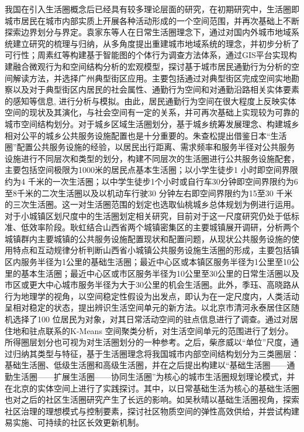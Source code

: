 \documentclass{shnuthesis}
\begin{document}
\indent 我国在引入生活圈概念后已经具有较多理论层面的研究，在初期研究中，生活圈即城市居民在城市内部实质上开展各种活动形成的一个空间范围，并再次基础上不断探索边界划分与界定。袁家东等人在日常生活圈理念下，通过对国内外城市地域系统建立研究的梳理与归纳，从多角度提出重建城市地域系统的理念，并初步分析了可行性\textsuperscript{\cite{yuan2005}}；周素红等构建基于智能图的个体行为调查方法体系，通过GIS平台实现构建融合微观行为和空间结构分析的宏观模型，探讨基于城市居民通勤行为分析的空间解读方法，并选择广州典型街区应用。主要包括通过对典型街区完成空间实地勘察以及对于典型街区内居民的社会属性、通勤行为空间和对通勤沿路相关实体要素的感知等信息, 进行分析与模拟。由此，居民通勤行为空间在很大程度上反映实体空间的现状及其演化，与社会空间有一定的关系，并可再次基础上实现较为可靠的城市空间结构划分\textsuperscript{\cite{zhou2006}}。对于城乡区域生活圈划分，基于城乡统筹发展理念、构建城乡相对公平的城乡公共服务设施配置也是十分重要的。朱查松提出借鉴日本“生活圈”配置公共服务设施的经验，以居民出行距离、需求频率和服务半径对公共服务设施进行不同层次和类型的划分，构建不同层次的生活圈进行公共服务设施配套，主要包括空间极限为1000米的居民点基本生活圈；以小学生徒步1 小时即空间界限约为4 千米的一次生活圈；以中学生徒步1个小时或自行车30分钟即空间界限约为6至8千米的二次生活圈以及以机动车行驶30 分钟左右即空间界限约为15至30 千米的三次生活圈。这一对生活圈范围的划定也选取仙桃城乡总体规划为例进行运用\textsuperscript{\cite{zhu2010a}}。对于小城镇区划尺度中的生活圈划定相关研究，目前对于这一尺度研究仍处于低标准、低效率阶段。耿虹结合山西省两个城镇密集区的主要城镇展开调研，分析两个城镇群内主要城镇的公共服务设施配置现状和配置问题，从现状公共服务设施的使用特点和互动规律分析判断山西省小城镇公共服务设施生活圈的形成，主要包括镇区内服务半径为1公里的基础生活圈；最近中心区或本镇区服务半径为1公里至10公里的基本生活圈；最近中心区或市区服务半径为10公里至30公里的日常生活圈以及市区或更大中心城市服务半径为大于30公里的机会生活圈\textsuperscript{\cite{geng2013}}。此外，季珏、高晓路从行为地理学的视角，以空间稳定性假设为出发点，即认为在一定尺度内，人类活动呈相对稳定的状态，提出辨识生活空间单元的新方法。以北京市清河永泰居住区随机选择了100 位居民为对象，对其日常活动空间的驻点信息进行了调查。通过对居住地和驻点联系的K-Means 空间聚类分析，对生活空间单元的范围进行了划分。所得圈层划分也可视为对生活圈划分的一种参考\textsuperscript{\cite{ji2012}}。之后，柴彦威以“单位”尺度，通过归纳其类型与特征，基于生活圈理念将我国城市内部空间结构划分为三类圈层：基础生活圈、低级生活圈和高级生活圈\textsuperscript{\cite{chai1996}}，并在之后提出构建以“基础生活圈——通勤生活圈——扩展生活圈——协同生活圈”为核心的城市生活圈规划理论模式，并在北京的实体空间上进行了实践探讨\textsuperscript{\cite{chai2015}}。其中，以日常基础生活为核心的基础生活圈也对之后的社区生活圈研究产生了长远的影响。如吴秋晴以基础生活圈视角，探索社区治理的理想模式与控制要素，探讨社区物质空间的弹性高效供给，并尝试构建易实施、可持续的社区长效更新机制\textsuperscript{\cite{wu2015}}。\\
\end{document}
